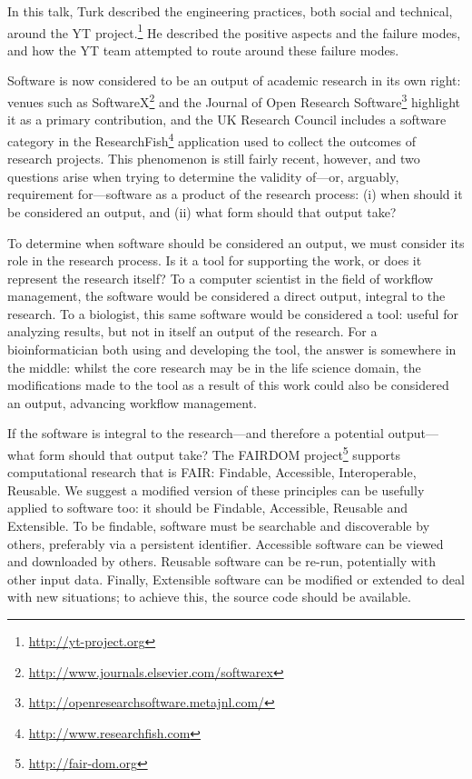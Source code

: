 \documentclass[a4paper,UKenglish]{dagrep}
\begin{document}

In this talk, Turk described the engineering practices, both social and
technical, around the YT project.\footnote{\url{http://yt-project.org}}
He described the positive aspects and the failure modes, and how the YT team attempted to
route around these failure modes.


Software is now considered to be an output of academic research in its own right: venues such as SoftwareX\footnote{\url{http://www.journals.elsevier.com/softwarex}} and the Journal of Open Research Software\footnote{\url{http://openresearchsoftware.metajnl.com/}} highlight it as a primary contribution, and the UK Research Council includes a software category in the ResearchFish\footnote{\url{http://www.researchfish.com}} application used to collect the outcomes of research projects. This phenomenon is still fairly recent, however, and two questions arise when trying to determine the validity of---or, arguably, requirement for---software as a product of the research process: (i) when should it be considered an output, and (ii) what form should that output take?

To determine when software should be considered an output, we must consider its role in the research process. Is it a tool for supporting the work, or does it represent the research itself? To a computer scientist in the field of workflow management, the software would be considered a direct output, integral to the research. To a biologist, this same software would be considered a tool: useful for analyzing results, but not in itself an output of the research. For a bioinformatician both using and developing the tool, the answer is somewhere in the middle: whilst the core research may be in the life science domain, the modifications made to the tool as a result of this work could also be considered an output, advancing workflow management.

If the software is integral to the research---and therefore a potential output---what form should that output take? The FAIRDOM project\footnote{\url{http://fair-dom.org}} supports computational research that is FAIR: Findable, Accessible, Interoperable, Reusable. We suggest a modified version of these principles can be usefully applied to software too: it should be Findable, Accessible, Reusable and Extensible. To be findable, software must be searchable and discoverable by others, preferably via a persistent identifier. Accessible software can be viewed and downloaded by others. Reusable software can be re-run, potentially with other input data. Finally, Extensible software can be modified or extended to deal with new situations; to achieve this, the source code should be available.
\end{document}
